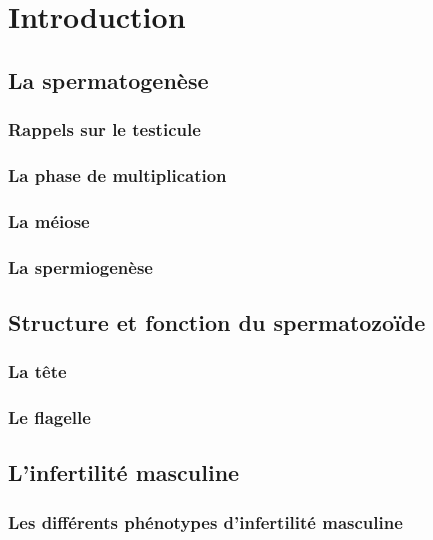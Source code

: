 \documentclass[12pt,twoside]{ugathesis}
\begin{document}
\chapter{Introduction}\label{introInf}

\section{La spermatogenèse}\label{la-spermatogenese}

\subsection{Rappels sur le testicule}\label{rappels-sur-le-testicule}

\subsection{La phase de
multiplication}\label{la-phase-de-multiplication}

\subsection{La méiose}\label{meiose}

\subsection{La spermiogenèse}\label{spermiogenese}

\section{Structure et fonction du
spermatozoïde}\label{structure-et-fonction-du-spermatozoide}

\subsection{La tête}\label{la-tete}

\subsection{Le flagelle}\label{le-flagelle}

\section{L'infertilité masculine}\label{linfertilite-masculine}

\subsection{Les différents phénotypes d'infertilité
masculine}\label{les-differents-phenotypes-dinfertilite-masculine}
\end{document}
